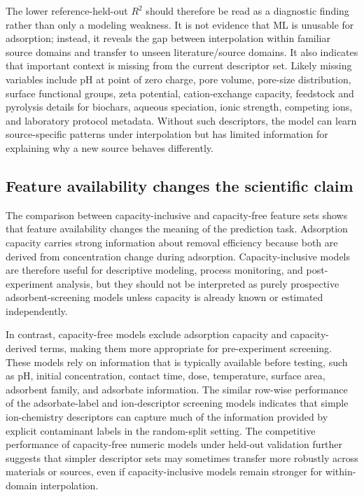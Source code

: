 \documentclass[review,12pt,number]{elsarticle}
\begin{document}
The lower reference-held-out $R^2$ should therefore be read as a diagnostic finding rather than only a modeling weakness. It is not evidence that ML is unusable for adsorption; instead, it reveals the gap between interpolation within familiar source domains and transfer to unseen literature/source domains. It also indicates that important context is missing from the current descriptor set. Likely missing variables include pH at point of zero charge, pore volume, pore-size distribution, surface functional groups, zeta potential, cation-exchange capacity, feedstock and pyrolysis details for biochars, aqueous speciation, ionic strength, competing ions, and laboratory protocol metadata. Without such descriptors, the model can learn source-specific patterns under interpolation but has limited information for explaining why a new source behaves differently.

\subsection{Feature availability changes the scientific claim}

The comparison between capacity-inclusive and capacity-free feature sets shows that feature availability changes the meaning of the prediction task. Adsorption capacity carries strong information about removal efficiency because both are derived from concentration change during adsorption. Capacity-inclusive models are therefore useful for descriptive modeling, process monitoring, and post-experiment analysis, but they should not be interpreted as purely prospective adsorbent-screening models unless capacity is already known or estimated independently.

In contrast, capacity-free models exclude adsorption capacity and capacity-derived terms, making them more appropriate for pre-experiment screening. These models rely on information that is typically available before testing, such as pH, initial concentration, contact time, dose, temperature, surface area, adsorbent family, and adsorbate information. The similar row-wise performance of the adsorbate-label and ion-descriptor screening models indicates that simple ion-chemistry descriptors can capture much of the information provided by explicit contaminant labels in the random-split setting. The competitive performance of capacity-free numeric models under held-out validation further suggests that simpler descriptor sets may sometimes transfer more robustly across materials or sources, even if capacity-inclusive models remain stronger for within-domain interpolation.
\end{document}
